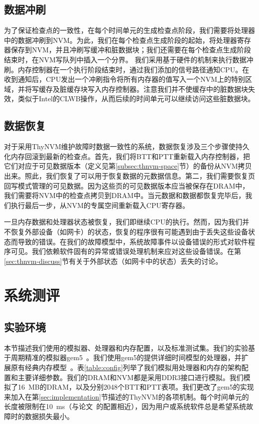 \subsection{数据冲刷}

为了保证检查点的一致性，在每个时间单元的生成检查点阶段，我们需要将处理器中的数据冲刷到NVM。为此，我们在每个检查点生成阶段的起始，将处理器寄存器保存到NVM，并且冲刷写缓冲和脏数据块；我们还需要在每个检查点生成阶段结束时，在NVM写队列中插入一个分界。 
我们采用基于硬件的机制来执行数据冲刷。内存控制器在一个执行阶段结束时，通过我们添加的信号路径通知CPU。在收到通知后，CPU发出一个冲刷指令将所有内存器的值写入一个NVM上的特别区域，并将写缓存及脏缓存块写入内存控制器。注意我们并不使缓存中的脏数据块失效，类似于Intel的CLWB操作，从而后续的时间单元可以继续访问这些脏数据块。

\subsection{数据恢复} 
对于采用ThyNVM维护故障时数据一致性的系统，数据恢复涉及三个步骤使持久化内存回滚到最新的检查点。首先，我们将BTT和PTT重新载入内存控制器，把它们对应于可见数据版本（定义见第\ref{subsec:thnvm-space}节）的备份从NVM拷贝出来。照此，我们恢复了可以用于恢复数据的元数据信息。第二，我们需要恢复页回写模式管理的可见数据。因为这些页的可见数据版本应当被保存在DRAM中，我们需要将NVM中的检查点拷贝到DRAM中。当元数据和数据都恢复完毕后，我们执行最后一步，从NVM的专属空间重新载入CPU寄存器。 

一旦内存数据和处理器状态被恢复，我们即继续CPU的执行。然而，因为我们并不恢复外部设备（如网卡）的状态，恢复的程序很有可能遇到由于丢失这些设备状态而导致的错误。在我们的故障模型中，系统故障事件以设备错误的形式对软件程序可见。我们依赖软件固有的异常或错误处理机制来应对这些设备错误。在第\ref{sec:thnvm-discuss}节有关于外部状态（如网卡中的状态）丢失的讨论。 

\section{系统测评}
\label{sec:thnvm-eval}

\subsection{实验环境}

本节描述我们使用的模拟器、处理器和内存配置，以及标准测试集。我们的实验基于周期精准的模拟器gem5~\cite{Binkert:2011:GS:2024716.2024718}。我们使用gem5的提供详细时间模型的处理器，并扩展原有经典内存模型~\cite{6844484}。表\ref{table:config}列举了我们模拟用处理器和内存的架构配置和主要详细参数。我们的DRAM和NVM都是采用DDR3接口进行模拟。我们模拟了16~MB的DRAM，以及分别2048个BTT和PTT表项。我们更改了gem5的实现来加入在第\ref{sec:implementation}节描述的ThyNVM的各项机制。每个时间单元的长度被限制在10~ms（与论文~\cite{1003567, 1003568}的配置相近），因为用户或系统软件总是希望系统故障时的数据损失最小。 

